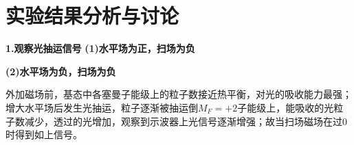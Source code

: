 \documentclass[UTF8]{ctexart}
\begin{document}
\section{实验结果分析与讨论}
\noindent\textbf{1.观察光抽运信号}
\newline\textbf{(1)水平场为正，扫场为负}
\begin{figure}[H]
\centering
{}
\end{figure}
\noindent\textbf{(2)水平场为负，扫场为负}
\begin{figure}[H]
\centering
{}
\end{figure}
外加磁场前，基态中各塞曼子能级上的粒子数接近热平衡，对光的吸收能力最强；增大水平场后发生光抽运，粒子逐渐被抽运倒$M_F=+2$子能级上，能吸收的光粒子数减少，透过的光增加，观察到示波器上光信号逐渐增强；故当扫场磁场在过0时得到如上信号。
\end{document}
